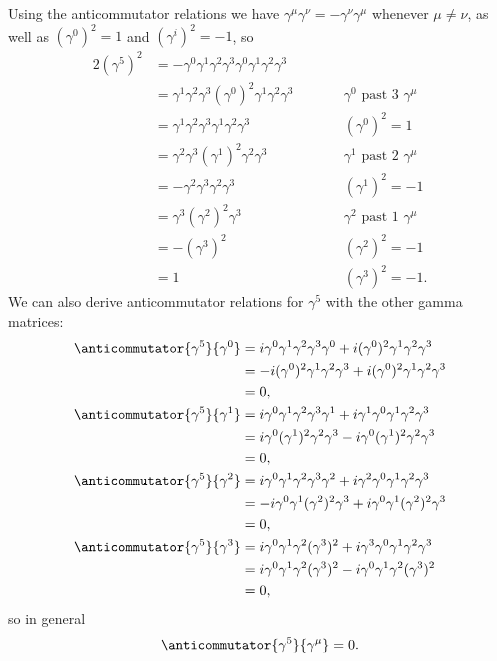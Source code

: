 \documentclass[fleqn]{NotesClass}
\begin{document}
    Using the anticommutator relations we have \(\gamma^\mu \gamma^\nu = -\gamma^\nu\gamma^\mu\) whenever \(\mu \ne \nu\), as well as \((\gamma^0)^2 = 1\) and \((\gamma^i)^2 = -1\), so
    \begin{alignat}{2}
        (\gamma^5)^2 &= -\gamma^0\gamma^1\gamma^2\gamma^3\gamma^0\gamma^1\gamma^2\gamma^3\\
        &= \gamma^1\gamma^2\gamma^3(\gamma^0)^2\gamma^1\gamma^2\gamma^3 \qquad && \gamma^0 \text{ past 3 }\gamma^\mu\\
        &= \gamma^1\gamma^2\gamma^3\gamma^1\gamma^2\gamma^3 && (\gamma^0)^2 = 1\\
        &= \gamma^2\gamma^3(\gamma^1)^2\gamma^2\gamma^3 && \gamma^1 \text{ past 2 } \gamma^\mu\\
        &= -\gamma^2\gamma^3\gamma^2\gamma^3 && (\gamma^1)^2 = -1\\
        &= \gamma^3(\gamma^2)^2\gamma^3 && \gamma^2 \text{ past 1 } \gamma^\mu\\
        &= -(\gamma^3)^2 && (\gamma^2)^2 = -1\\
        &= 1 && (\gamma^3)^2 = -1.
    \end{alignat}
    We can also derive anticommutator relations for \(\gamma^5\) with the other gamma matrices:
    \begin{align}
        \anticommutator{\gamma^5}{\gamma^0} &= i\gamma^0\gamma^1\gamma^2\gamma^3\gamma^0 + i(\gamma^0)^2\gamma^1\gamma^2\gamma^3\\
        &= -i(\gamma^0)^2\gamma^1\gamma^2\gamma^3 + i(\gamma^0)^2\gamma^1\gamma^2\gamma^3\\
        &= 0,\\
        \anticommutator{\gamma^5}{\gamma^1} &= i\gamma^0\gamma^1\gamma^2\gamma^3\gamma^1 + i\gamma^1\gamma^0\gamma^1\gamma^2\gamma^3\\
        &= i\gamma^0(\gamma^1)^2\gamma^2\gamma^3 - i\gamma^0(\gamma^1)^2\gamma^2\gamma^3\\
        &= 0,\\
        \anticommutator{\gamma^5}{\gamma^2} &= i\gamma^0\gamma^1\gamma^2\gamma^3\gamma^2 + i\gamma^2\gamma^0\gamma^1\gamma^2\gamma^3\\
        &= -i\gamma^0\gamma^1(\gamma^2)^2\gamma^3 + i\gamma^0\gamma^1(\gamma^2)^2\gamma^3\\
        &= 0,\\
        \anticommutator{\gamma^5}{\gamma^3} &= i\gamma^0\gamma^1\gamma^2(\gamma^3)^2 + i\gamma^3\gamma^0\gamma^1\gamma^2\gamma^3\\
        &= i\gamma^0\gamma^1\gamma^2(\gamma^3)^2 - i\gamma^0\gamma^1\gamma^2(\gamma^3)^2\\
        &= 0,
    \end{align}
    so in general
    \begin{equation}
        \anticommutator{\gamma^5}{\gamma^\mu} = 0.
    \end{equation}
    
\end{document}
